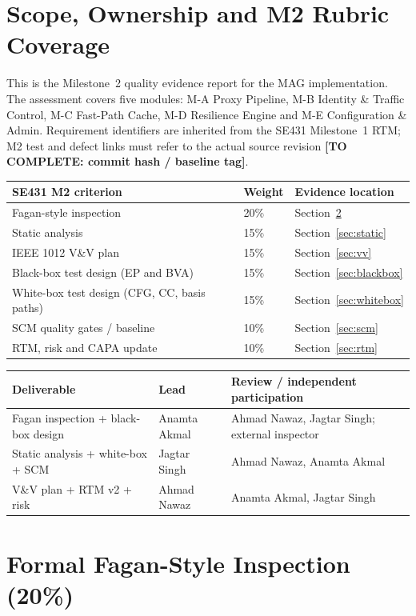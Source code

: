 \documentclass[11pt,a4paper]{article}
\newcommand{\ma}{Ahmad Nawaz}
\newcommand{\mb}{Anamta Akmal}
\newcommand{\mc}{Jagtar Singh}
\newcommand{\todo}[1]{\textcolor{red!70!black}{\textbf{[TO COMPLETE: #1]}}}
\begin{document}
\section{Scope, Ownership and M2 Rubric Coverage}
This is the Milestone~2 quality evidence report for the MAG implementation. The assessment covers five modules: M-A Proxy Pipeline, M-B Identity \& Traffic Control, M-C Fast-Path Cache, M-D Resilience Engine and M-E Configuration \& Admin. Requirement identifiers are inherited from the SE431 Milestone~1 RTM; M2 test and defect links must refer to the actual source revision \todo{commit hash / baseline tag}.
\begin{longtable}{L{6.1cm} L{1.7cm} L{5.4cm}}\toprule
\textbf{SE431 M2 criterion} & \textbf{Weight} & \textbf{Evidence location}\\\midrule\endhead
Fagan-style inspection & 20\% & Section~\ref{sec:inspection}\\
Static analysis & 15\% & Section~\ref{sec:static}\\
IEEE 1012 V\&V plan & 15\% & Section~\ref{sec:vv}\\
Black-box test design (EP and BVA) & 15\% & Section~\ref{sec:blackbox}\\
White-box test design (CFG, CC, basis paths) & 15\% & Section~\ref{sec:whitebox}\\
SCM quality gates / baseline & 10\% & Section~\ref{sec:scm}\\
RTM, risk and CAPA update & 10\% & Section~\ref{sec:rtm}\\\bottomrule
\end{longtable}
\begin{longtable}{L{5.1cm} L{3cm} L{4.9cm}}\toprule
\textbf{Deliverable} & \textbf{Lead} & \textbf{Review / independent participation}\\\midrule\endhead
Fagan inspection + black-box design & \mb & \ma, \mc; external inspector \\
Static analysis + white-box + SCM & \mc & \ma, \mb\\
V\&V plan + RTM v2 + risk & \ma & \mb, \mc\\\bottomrule\end{longtable}

\section{Formal Fagan-Style Inspection (20\%)}\label{sec:inspection}
\end{document}
